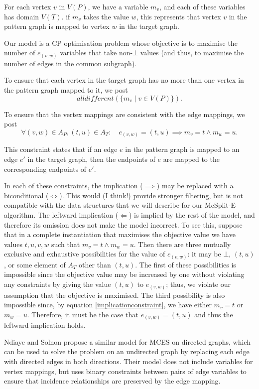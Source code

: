 For each vertex $v$ in $V(P)$, we have a variable $m_v$, and each of these variables has domain $V(T)$.
if $m_v$ takes the value $w$, this represents that vertex $v$ in the pattern graph is mapped to vertex
$w$ in the target graph.

Our model is a CP optimisation problem whose objective is to maximise
the number of $e_{(v,w)}$ variables that take non-$\bot$ values (and thus, to maximise the number of
edges in the common subgraph).

To ensure that each vertex in the target graph has no more than one vertex in the pattern graph mapped
to it, we post
\[
\textit{alldifferent}(\{m_v \mid v \in V(P)\}).
\]

To ensure that the vertex mappings are consistent with the edge mappings, we post
\begin{equation}
\label{implicationconstraint}
\forall (v,w) \in A_P, (t,u) \in A_T : \quad e_{(v,w)} = (t,u) \implies m_v=t \wedge m_w=u.
\end{equation}

This constraint states that if an edge $e$ in the pattern graph is mapped to an edge $e'$ in the target graph, then the endpoints of $e$ are mapped to the corresponding
endpoints of $e'$.

In each of these constraints, the implication ($\implies$) may be replaced with a 
biconditional ($\Longleftrightarrow$).  This would (I think!) provide stronger filtering, but is not
compatible with the data structures that we will describe for our McSplit-E
algorithm.  The leftward implication ($\Longleftarrow$)
is implied by the rest of the model, and therefore its omission does not make the model incorrect.
To see this, suppose that in a complete instantiation that maximises the objective value
we have values $t,u,v,w$ such
that $m_v=t \wedge m_w=u$.  Then there are three mutually exclusive and exhaustive possibilities for the
value of $e_{(v,w)}$: it may be $\bot$, $(t,u)$, or some element of $A_T$ other than $(t,u)$.
The first of these possibilities is impossible since the objective
value may be increased by one without violating any constraints by giving the value $(t,u)$ to $e_{(v,w)}$;
thus, we violate our assumption that the objective is maximised.
The third possibility is also impossible since, by equation \ref{implicationconstraint}, we have
either $m_v=t$ or $m_w=u$.  Therefore, it must be the case that $e_{(v,w)} = (t,u)$
and thus the leftward implication holds.

Ndiaye and Solnon \cite{DBLP:conf/cp/NdiayeS11} propose a similar model for MCES on directed graphs,
which can be used to solve the problem on an undirected graph by replacing each edge with directed
edges in both directions.  Their model does not include variables for vertex mappings, but uses binary
constraints between pairs of edge variables to ensure that incidence relationships are preserved
by the edge mapping.  %

